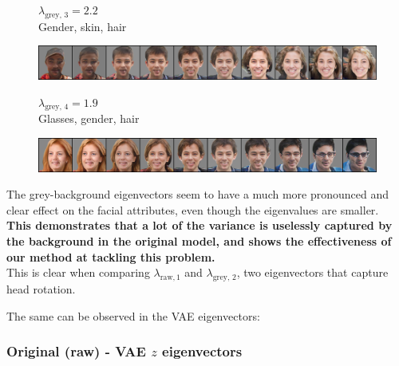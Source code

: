 \documentclass{article}
\begin{document}
\begin{figure}[H]
  \centering
  \begin{minipage}{.18\linewidth}
      \centering
      $\lambda_{\text{grey, 3}} = 2.2$ \\
      Gender, skin, hair
  \end{minipage}%
  \hfill
  \begin{minipage}{.81\linewidth}
      \centering
      \includegraphics[width=\linewidth]{eigen/grey_gan_3.png}
  \end{minipage}
\end{figure}

\begin{figure}[H]
  \centering
  \begin{minipage}{.18\linewidth}
      \centering
      $\lambda_{\text{grey, 4}} = 1.9$ \\
      Glasses, gender, hair
  \end{minipage}%
  \hfill
  \begin{minipage}{.81\linewidth}
      \centering
      \includegraphics[width=\linewidth]{eigen/grey_gan_4.png}
  \end{minipage}
\end{figure}

The grey-background eigenvectors seem to have a much more pronounced and clear effect on the facial attributes, even though the eigenvalues are smaller. \\
\textbf{This demonstrates that a lot of the variance is uselessly captured by the background in the original model, and shows the effectiveness of our method at tackling this problem.}\\
This is clear when comparing $\lambda_{\text{raw}, 1}$ and $\lambda_{\text{grey, 2}}$, two eigenvectors that capture head rotation.

The same can be observed in the VAE eigenvectors:

\subsubsection*{Original (raw) - VAE $z$ eigenvectors}
\end{document}
